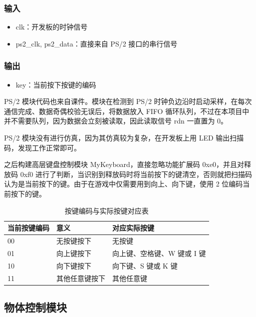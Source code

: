 \documentclass[hyperref,UTF8,12pt,a4paper]{ctexart}
\providecommand{\tightlist}{%
  \setlength{\itemsep}{0pt}\setlength{\parskip}{0pt}}
\begin{document}
\hypertarget{ux8f93ux5165-1}{%
\subsubsection{输入}\label{ux8f93ux5165-1}}

\begin{itemize}
\tightlist
\item
  clk：开发板的时钟信号
\item
  ps2\_clk, ps2\_data：直接来自 PS/2 接口的串行信号
\end{itemize}

\hypertarget{ux8f93ux51fa-1}{%
\subsubsection{输出}\label{ux8f93ux51fa-1}}

\begin{itemize}
\tightlist
\item
  key：当前按下按键的编码
\end{itemize}

PS/2 模块代码也来自课件。模块在检测到 PS/2
时钟负边沿时启动采样，在每次通信完成、数据奇偶校验无误后，将数据放入
FIFO
循环队列，不过在本项目中并不需要队列，因为数据会立刻被读取，因此读取信号
rdn 一直置为 0。

PS/2 模块没有进行仿真，因为其仿真较为复杂，在开发板上用 LED
输出扫描码，发现工作正常即可。

之后构建高层键盘控制模块 MyKeyboard，直接忽略功能扩展码
0xe0，并且对释放码 0xf0
进行了判断，当识别到释放码时将当前按下的键清空，否则就把扫描码认为是当前按下的键。由于在游戏中仅需要用到向上、向下键，使用
2 位编码当前按下的键。

\begin{longtable}[]{@{}lll@{}}
\caption{按键编码与实际按键对应表}\tabularnewline
\toprule
当前按键编码 & 意义 & 对应实际按键 \\
\midrule
\endhead
00 & 无按键按下 & 无按键 \\
01 & 向上键按下 & 向上键、空格键、W 键或 I 键 \\
10 & 向下键按下 & 向下键、S 键或 K 键 \\
11 & 其他任意键按下 & 其他任意键 \\
\bottomrule
\end{longtable}

\hypertarget{ux7269ux4f53ux63a7ux5236ux6a21ux5757}{%
\subsection{物体控制模块}\label{ux7269ux4f53ux63a7ux5236ux6a21ux5757}}
\end{document}
